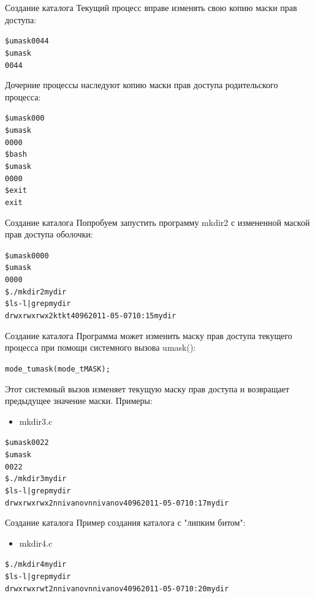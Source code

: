 \documentclass{beamer}
\begin{document}
\begin{frame}[fragile]{Создание каталога}
Текущий процесс вправе изменять свою копию маски прав доступа:
\begin{alltt}
\$ umask 0044
\$ umask
0044
\end{alltt}
Дочерние процессы наследуют копию маски прав доступа родительского процесса:
\begin{alltt}
\$ umask 000
\$ umask
0000
\$ bash
\$ umask
0000
\$ exit
exit
\end{alltt}
\end{frame}

\begin{frame}[fragile]{Создание каталога}
Попробуем запустить программу mkdir2 с измененной маской прав доступа оболочки:
\begin{alltt}
\$ umask 0000
\$ umask
0000
\$ ./mkdir2 mydir
\$ ls -l | grep mydir
drwxrwxrwx 2 kt kt 4096 2011-05-07 10:15 mydir
\end{alltt}
\end{frame}

\begin{frame}[fragile]{Создание каталога}
Программа может изменить маску прав доступа текущего процесса при помощи
системного вызова umask():
\begin{alltt}
mode_t umask (mode_t MASK);
\end{alltt}
Этот системный вызов изменяет текущую маску прав доступа и возвращает предыдущее значение маски.
Примеры: 
\begin{itemize}
\item mkdir3.c
\end{itemize}
\begin{alltt}
\$ umask 0022
\$ umask
0022
\$ ./mkdir3 mydir
\$ ls -l | grep mydir
drwxrwxrwx 2 nnivanov nnivanov 4096 2011-05-07 10:17 mydir
\end{alltt}
\end{frame}

\begin{frame}[fragile]{Создание каталога}
Пример создания каталога с "липким битом":  
\begin{itemize}
\item mkdir4.c
\end{itemize}
\begin{alltt}
\$ ./mkdir4 mydir
\$ ls -l | grep mydir
drwxrwxrwt 2 nnivanov nnivanov 4096 2011-05-07 10:20 mydir
\end{alltt}
\end{frame}
\end{document}
